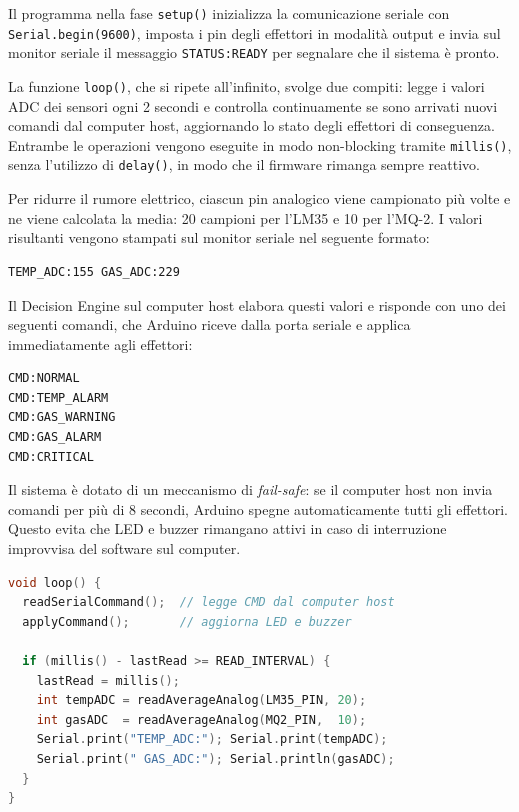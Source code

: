 \documentclass{article}
\begin{document}
Il programma nella fase \texttt{setup()} inizializza la comunicazione seriale
con \texttt{Serial.begin(9600)}, imposta i pin degli effettori in modalità
output e invia sul monitor seriale il messaggio \texttt{STATUS:READY} per
segnalare che il sistema è pronto.

La funzione \texttt{loop()}, che si ripete all'infinito, svolge due compiti:
legge i valori ADC dei sensori ogni 2 secondi e controlla continuamente se
sono arrivati nuovi comandi dal computer host, aggiornando lo stato degli
effettori di conseguenza. Entrambe le operazioni vengono eseguite in modo
non-blocking tramite \texttt{millis()}, senza l'utilizzo di \texttt{delay()},
in modo che il firmware rimanga sempre reattivo.

Per ridurre il rumore elettrico, ciascun pin analogico viene campionato più
volte e ne viene calcolata la media: 20 campioni per l'LM35 e 10 per l'MQ-2.
I valori risultanti vengono stampati sul monitor seriale nel seguente formato:

\begin{lstlisting}[language={}]
TEMP_ADC:155 GAS_ADC:229
\end{lstlisting}

Il Decision Engine sul computer host elabora questi valori e risponde con uno
dei seguenti comandi, che Arduino riceve dalla porta seriale e applica
immediatamente agli effettori:

\begin{lstlisting}[language={}]
CMD:NORMAL
CMD:TEMP_ALARM
CMD:GAS_WARNING
CMD:GAS_ALARM
CMD:CRITICAL
\end{lstlisting}

Il sistema è dotato di un meccanismo di \textit{fail-safe}: se il computer
host non invia comandi per più di 8 secondi, Arduino spegne automaticamente
tutti gli effettori. Questo evita che LED e buzzer rimangano attivi in caso
di interruzione improvvisa del software sul computer.

\begin{lstlisting}[language=C++, caption={Estratto dalla funzione loop()}]
void loop() {
  readSerialCommand();  // legge CMD dal computer host
  applyCommand();       // aggiorna LED e buzzer

  if (millis() - lastRead >= READ_INTERVAL) {
    lastRead = millis();
    int tempADC = readAverageAnalog(LM35_PIN, 20);
    int gasADC  = readAverageAnalog(MQ2_PIN,  10);
    Serial.print("TEMP_ADC:"); Serial.print(tempADC);
    Serial.print(" GAS_ADC:"); Serial.println(gasADC);
  }
}
\end{lstlisting}
\end{document}
